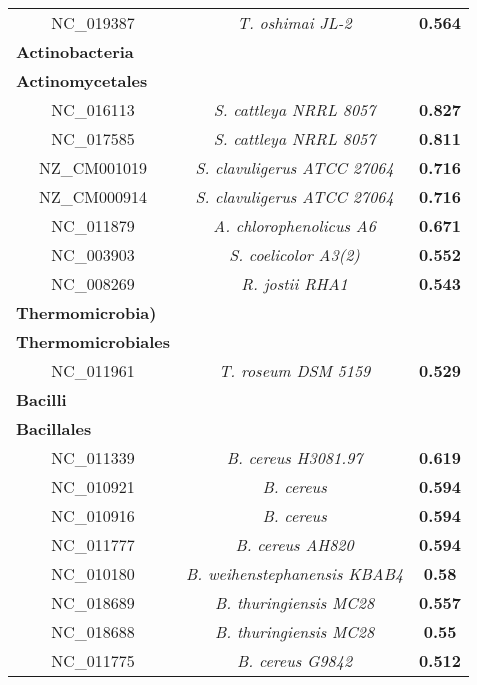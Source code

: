 \begin{landscape}
\begin{table}
\begin{minipage}[t]{0.5\textwidth}
\begin{tiny}
\begin{tabular}{c>{\itshape}c>{\bfseries}c}
NC\_019387&T. oshimai JL-2&0.564\\
\multicolumn{1}{l}{\textbf{Actinobacteria}}\\
\hline
\multicolumn{1}{l}{\textbf{Actinomycetales}}\\
NC\_016113&S. cattleya NRRL 8057&0.827\\
NC\_017585&S. cattleya NRRL 8057&0.811\\
NZ\_CM001019&S. clavuligerus ATCC 27064&0.716\\
NZ\_CM000914&S. clavuligerus ATCC 27064&0.716\\
NC\_011879&A. chlorophenolicus A6&0.671\\
NC\_003903&S. coelicolor A3(2)&0.552\\
NC\_008269&R. jostii RHA1&0.543\\
\multicolumn{1}{l}{\textbf{Thermomicrobia)}}\\
\hline
\multicolumn{1}{l}{\textbf{Thermomicrobiales}}\\
NC\_011961&T. roseum DSM 5159&0.529\\
\multicolumn{1}{l}{\textbf{Bacilli}}\\
\hline
\multicolumn{1}{l}{\textbf{Bacillales}}\\
NC\_011339&B. cereus H3081.97&0.619\\
NC\_010921&B. cereus&0.594\\
NC\_010916&B. cereus&0.594\\
NC\_011777&B. cereus AH820&0.594\\
NC\_010180&B. weihenstephanensis KBAB4&0.58\\
NC\_018689&B. thuringiensis MC28&0.557\\
NC\_018688&B. thuringiensis MC28&0.55\\
NC\_011775&B. cereus G9842&0.512\\
	  \end{tabular}
	  \end{tiny}
	  
	  	 \label{tabclassifrece2}
	  	 

\end{minipage}
\end{table}
\end{landscape}
